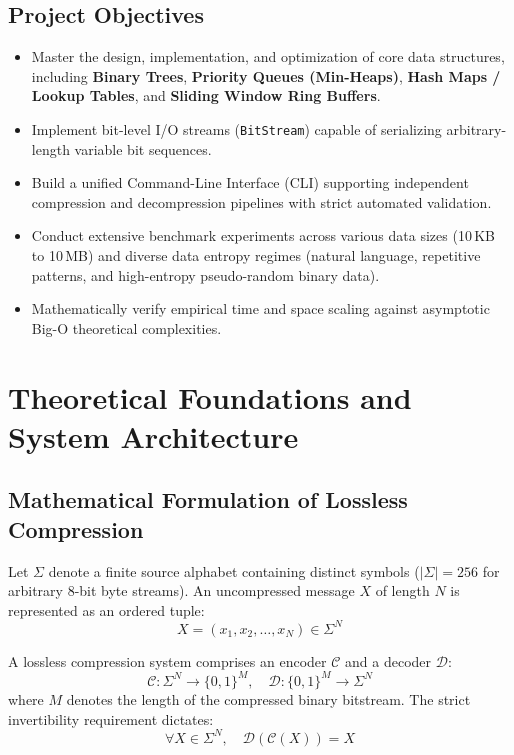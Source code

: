 \documentclass[12pt,a4paper]{article}
\begin{document}
\subsection{Project Objectives}
\begin{itemize}
    \item Master the design, implementation, and optimization of core data structures, including \textbf{Binary Trees}, \textbf{Priority Queues (Min-Heaps)}, \textbf{Hash Maps / Lookup Tables}, and \textbf{Sliding Window Ring Buffers}.
    \item Implement bit-level I/O streams (\texttt{BitStream}) capable of serializing arbitrary-length variable bit sequences.
    \item Build a unified Command-Line Interface (CLI) supporting independent compression and decompression pipelines with strict automated validation.
    \item Conduct extensive benchmark experiments across various data sizes (10\,KB to 10\,MB) and diverse data entropy regimes (natural language, repetitive patterns, and high-entropy pseudo-random binary data).
    \item Mathematically verify empirical time and space scaling against asymptotic Big-O theoretical complexities.
\end{itemize}

\section{Theoretical Foundations and System Architecture}

\subsection{Mathematical Formulation of Lossless Compression}
Let $\Sigma$ denote a finite source alphabet containing distinct symbols ($|\Sigma| = 256$ for arbitrary 8-bit byte streams). An uncompressed message $X$ of length $N$ is represented as an ordered tuple:
\begin{equation}
X = (x_1, x_2, \dots, x_N) \in \Sigma^N
\end{equation}

A lossless compression system comprises an encoder $\mathcal{C}$ and a decoder $\mathcal{D}$:
\begin{equation}
\mathcal{C}: \Sigma^N \to \{0, 1\}^M, \quad \mathcal{D}: \{0, 1\}^M \to \Sigma^N
\end{equation}
where $M$ denotes the length of the compressed binary bitstream. The strict invertibility requirement dictates:
\begin{equation}
\forall X \in \Sigma^N, \quad \mathcal{D}(\mathcal{C}(X)) = X
\end{equation}
\end{document}
